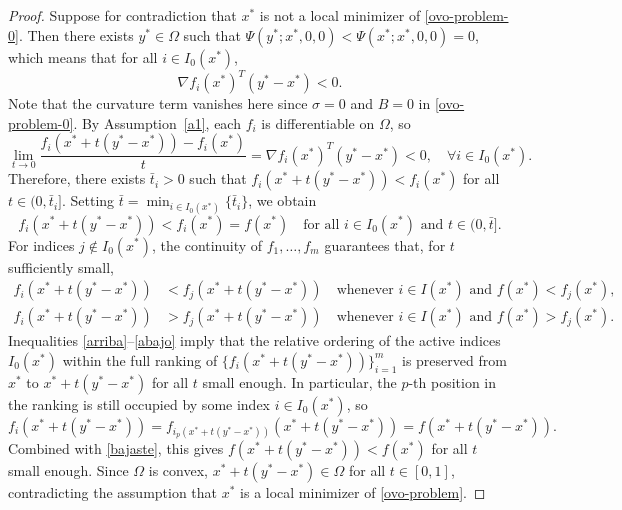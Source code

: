 \documentclass[11pt]{article}
\begin{document}
\begin{proof}
Suppose for contradiction that $x^*$ is not a local minimizer of 
\eqref{ovo-problem-0}. Then there exists $y^* \in \Omega$ such that 
$\Psi(y^*; x^*, 0, 0) < \Psi(x^*; x^*, 0, 0) = 0$, which means that 
for all $i \in I_0(x^*)$,
\begin{equation*}
    \nabla f_i(x^*)^T(y^* - x^*) < 0.
\end{equation*}
Note that the curvature term vanishes here since $\sigma = 0$ and 
$B = 0$ in \eqref{ovo-problem-0}. By Assumption~\ref{a1}, each 
$f_i$ is differentiable on $\Omega$, so
\begin{equation*}
    \lim_{t \to 0} \frac{f_i(x^* + t(y^* - x^*)) - f_i(x^*)}{t} 
    = \nabla f_i(x^*)^T(y^* - x^*) < 0, 
    \quad \forall i \in I_0(x^*).
\end{equation*}
Therefore, there exists $\bar{t}_i > 0$ such that 
$f_i(x^* + t(y^* - x^*)) < f_i(x^*)$ for all $t \in (0, \bar{t}_i]$. 
Setting $\bar{t} = \min_{i \in I_0(x^*)}\{\bar{t}_i\}$, we obtain
\begin{equation} \label{bajaste}
    f_i(x^* + t(y^* - x^*)) < f_i(x^*) = f(x^*) 
    \quad \text{for all } i \in I_0(x^*) \text{ and } t \in (0, \bar{t}].
\end{equation}
For indices $j \notin I_0(x^*)$, the continuity of $f_1, \ldots, f_m$ 
guarantees that, for $t$ sufficiently small,
\begin{align}
    f_i(x^* + t(y^* - x^*)) &< f_j(x^* + t(y^* - x^*)) 
    \quad \text{whenever } i \in I(x^*) \text{ and } 
    f(x^*) < f_j(x^*), \label{arriba} \\
    f_i(x^* + t(y^* - x^*)) &> f_j(x^* + t(y^* - x^*)) 
    \quad \text{whenever } i \in I(x^*) \text{ and } 
    f(x^*) > f_j(x^*). \label{abajo}
\end{align}
Inequalities \eqref{arriba}--\eqref{abajo} imply that the relative 
ordering of the active indices $I_0(x^*)$ within the full ranking of 
$\{f_i(x^* + t(y^* - x^*))\}_{i=1}^m$ is preserved from $x^*$ to 
$x^* + t(y^* - x^*)$ for all $t$ small enough. In particular, the 
$p$-th position in the ranking is still occupied by some index 
$i \in I_0(x^*)$, so
\begin{equation*}
    f_i(x^* + t(y^* - x^*)) = f_{i_p(x^* + t(y^* - x^*))}
    (x^* + t(y^* - x^*)) = f(x^* + t(y^* - x^*)).
\end{equation*}
Combined with \eqref{bajaste}, this gives $f(x^* + t(y^* - x^*)) < 
f(x^*)$ for all $t$ small enough. Since $\Omega$ is convex, 
$x^* + t(y^* - x^*) \in \Omega$ for all $t \in [0,1]$, contradicting 
the assumption that $x^*$ is a local minimizer of 
\eqref{ovo-problem}.
\end{proof}
\end{document}
